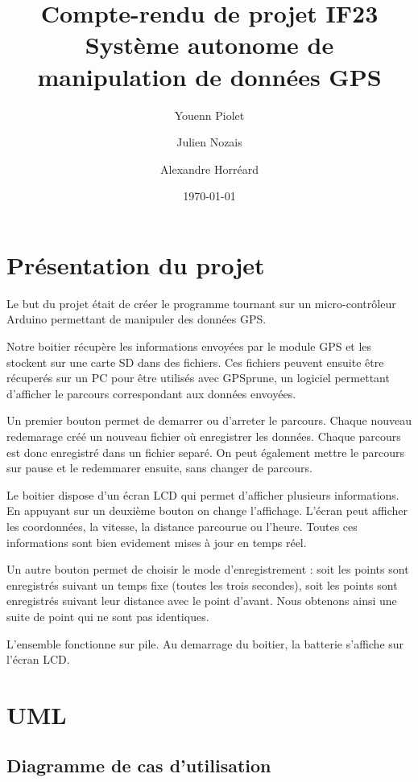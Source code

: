 \documentclass[a4paper,12pt,titlepage]{article}
\title{Compte-rendu de projet IF23\\Système autonome de manipulation de données GPS}
\author{Youenn Piolet \and Julien Nozais \and Alexandre Horréard}
\date{\today} %
\begin{document}
\maketitle

\tableofcontents

\newpage

\section{Présentation du projet}

Le but du projet était de créer le programme tournant sur un micro-contrôleur Arduino permettant de manipuler des données GPS.

Notre boitier récupère les informations envoyées par le module GPS et les stockent sur une carte SD dans des fichiers. 
Ces fichiers peuvent ensuite être récuperés sur un PC pour être utilisés avec GPSprune, un logiciel permettant d'afficher
le parcours correspondant aux données envoyées.

\medskip
Un premier bouton permet de demarrer ou d'arreter le parcours. Chaque nouveau redemarage créé un nouveau fichier où enregistrer les données.
Chaque parcours est donc enregistré dans un fichier separé. On peut également mettre le parcours sur pause et le redemmarer ensuite, sans changer de parcours.

Le boitier dispose d'un écran LCD qui permet d'afficher plusieurs informations. En appuyant sur un deuxième bouton on change l'affichage.
L'écran peut afficher les coordonnées, la vitesse, la distance parcourue ou l'heure. Toutes ces informations sont bien evidement mises à jour en temps réel.

Un autre bouton permet de choisir le mode d'enregistrement : soit les points sont enregistrés suivant un temps fixe (toutes les trois secondes),
soit les points sont enregistrés suivant leur distance avec le point d'avant. Nous obtenons ainsi une suite de point qui ne sont pas identiques.

L'ensemble fonctionne sur pile. Au demarrage du boitier, la batterie s'affiche sur l'écran LCD.


\section{UML}

\subsection{Diagramme de cas d'utilisation}
\end{document}

